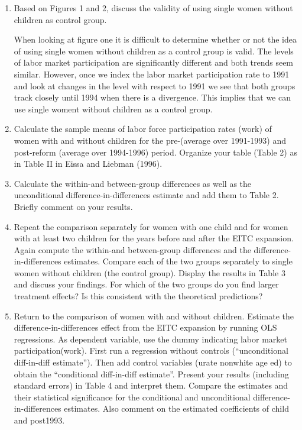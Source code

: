 \documentclass{article}
\begin{document}
\begin{enumerate}[label=\alph*]
\item  Based on Figures 1 and 2, discuss the validity of using single women without children as control group.

When looking at figure one it is difficult to determine whether or not the idea of using single women without children as a control group is valid.  The levels of labor market participation are significantly different and both trends seem similar.  However, once we index the labor market participation rate to 1991 and look at changes in the level with respect to 1991 we see that both groups track closely until 1994 when there is a divergence.  This implies that we can use single woment without children as a control group.

\item Calculate the sample means of labor force participation rates (work) of women with and without children for the pre-(average over 1991-1993) and post-reform (average over 1994-1996) period. Organize your table (Table 2) as in Table II in Eissa and Liebman (1996).



\item Calculate the within-and between-group differences as well as the unconditional difference-in-differences estimate and add them to Table 2. Briefly comment on your results.

\item  Repeat the comparison separately for women with one child and for women with at least two children for the years before and after the EITC expansion. Again compute the within-and between-group differences and the difference-in-differences estimates. Compare each of the two groups separately to single women without children (the control group). Display the results in Table 3 and discuss your findings. For which of the two groups do you find larger treatment effects? Is this consistent with the theoretical predictions?

\item Return to the comparison of women with and without children. Estimate the difference-in-differences effect from the EITC expansion by running OLS regressions. As dependent variable, use the dummy indicating labor market participation(work). First run a regression without controls (“unconditional diff-in-diff estimate”). Then add control variables (urate nonwhite age ed) to obtain the “conditional diff-in-diff estimate”. Present your results (including standard errors) in Table 4 and interpret them. Compare the estimates and their statistical significance for the conditional and unconditional difference-in-differences estimates. Also comment on the estimated coefficients of child and post1993.


\end{enumerate}
\end{document}
